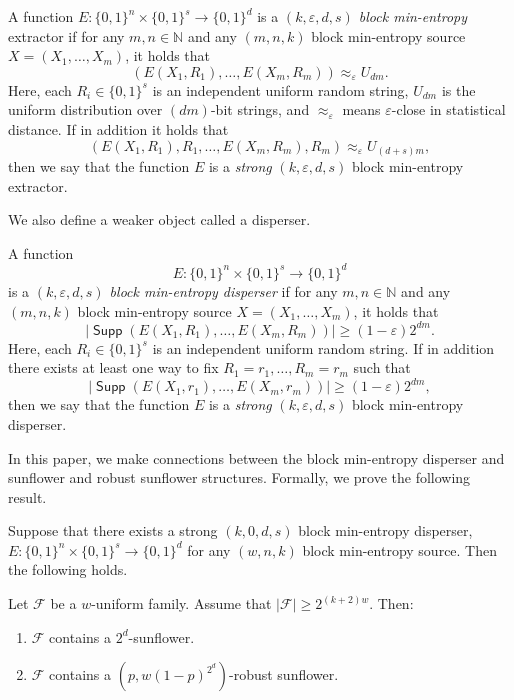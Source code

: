 \documentclass{toc}
\newcommand{\nnn}{\mathbb{N}}   %
\newcommand{\eps}{\varepsilon}
\newcommand{\calF}{\mathcal{F}} %
\DeclareMathOperator{\Supp}{\mathsf{Supp}}  %
\begin{document}
\begin{definition}
A function $E:\{0,1\}^{n}\times\{0,1\}^{s}\rightarrow\{0,1\}^{d}$ is
a \emph{$(k,\eps,d,s)$ block min-entropy} extractor if for any
$m, n \in \nnn$ and any $(m, n, k)$ block min-entropy source
$X=(X_1, \ldots, X_m)$, it holds that
\[ (E(X_1, R_1), \ldots, E(X_m, R_m)) \approx_{\eps} U_{dm}. \]
Here, each $R_i \in \{0,1\}^{s}$ is an independent
uniform random string,
$U_{dm}$ is the uniform distribution over
%
$(dm)$-bit strings,  %
%
and $\approx_{\eps}$ means $\eps$-close in statistical distance.
If in addition it holds that
\[ (E(X_1, R_1), R_1, \ldots, E(X_m, R_m), R_m) \approx_{\eps} U_{(d+s)m}, \]
then we say that the function $E$ is a \emph{strong} $(k,\eps,d,s)$
block min-entropy extractor.
\end{definition}

We also define a weaker object called a disperser.

\begin{definition}
A function
\[ E:\{0,1\}^{n}\times\{0,1\}^{s}\rightarrow\{0,1\}^{d} \]
is a \emph{$(k,\eps,d,s)$ block min-entropy disperser} if for any
$m, n \in \nnn$ and any $(m, n, k)$ block min-entropy source
$X=(X_1, \ldots, X_m)$, it holds that
%
%
\[|\Supp(E(X_1, R_1), \ldots, E(X_m, R_m))| \geq (1-\eps) 2^{dm}. \]
Here, each $R_i \in \{0,1\}^{s}$ is an independent uniform random string.
%
%
If in addition there exists at least one
%
way to fix  %
$R_1=r_1, \ldots, R_m=r_m$  such that
\[ |\Supp(E(X_1, r_1), \ldots, E(X_m, r_m))| \geq (1-\eps) 2^{dm}, \] 
then we say that the function $E$ is a \emph{strong} $(k,\eps,d,s)$
block min-entropy disperser.
\end{definition}

In this paper, we make connections between the block min-entropy disperser and
sunflower and robust sunflower structures. Formally, we prove the following
%
result.   %

\begin{theorem}\label{thm:main}
Suppose that there exists a strong $(k,0,d,s)$ block min-entropy disperser,
$E:\{0,1\}^{n}\times\{0,1\}^{s}\rightarrow\{0,1\}^{d}$ for any $(w, n, k)$ block min-entropy source.
Then the following holds.

Let $\calF$ be a %
$w$-uniform family.  %
Assume that $|\calF| \geq 2^{(k+2) w}$. Then:
\begin{enumerate}
\item[(i)] $\calF$ contains a $2^d$-sunflower.
\item[(ii)] $\calF$ contains a $\left(p, w (1-p)^{2^{d}}\right)$-robust sunflower.
\end{enumerate}
\end{theorem}
\end{document}
